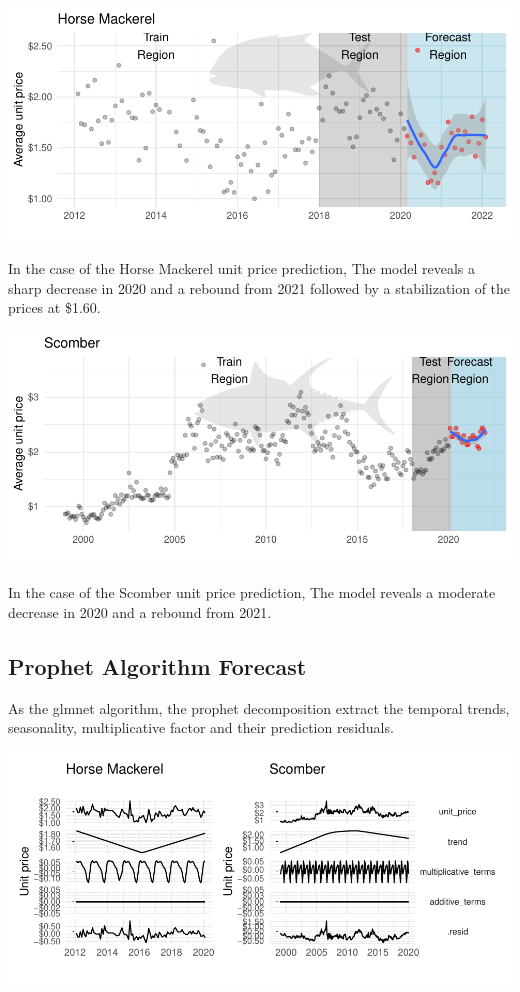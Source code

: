 \documentclass[10,a4paperpaper,]{article}
\begin{document}
\includegraphics{report_files/figure-latex/unnamed-chunk-5-1.pdf}

In the case of the Horse Mackerel unit price prediction, The model
reveals a sharp decrease in 2020 and a rebound from 2021 followed by a
stabilization of the prices at \$1.60.

\includegraphics{report_files/figure-latex/unnamed-chunk-6-1.pdf}

In the case of the Scomber unit price prediction, The model reveals a
moderate decrease in 2020 and a rebound from 2021.

\subsection{Prophet Algorithm Forecast}

As the glmnet algorithm, the prophet decomposition extract the temporal
trends, seasonality, multiplicative factor and their prediction
residuals.

\includegraphics{report_files/figure-latex/unnamed-chunk-7-1.pdf}
\end{document}
